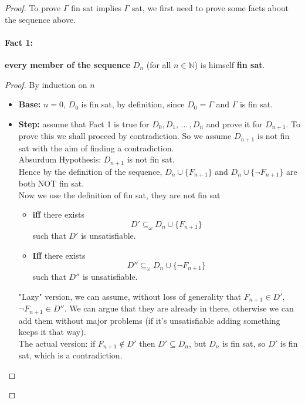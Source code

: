 \begin{proof}
		To prove $\Gamma$ fin sat implies $\Gamma$ sat, we first need to prove some facts about the sequence above.\\

		\newpage

		\paragraph{Fact 1:} \textbf{every member of the sequence} $D_n$ (for all $n \in \mathbb{N}$) is himself \textbf{fin sat}.

		\begin{proof}
			By induction on $n$
			\begin{itemize}
				\item \textbf{Base:} $n=0$, $D_0$ is fin sat, by definition, since $D_0 = \Gamma$ and $\Gamma$ is fin sat.

				\item \textbf{Step:} assume that Fact 1 is true for $D_0, D_1, \, ... \, , D_n$ and prove it for $D_{n+1}$. To prove this we shall proceed by contradiction. So we assume $D_{n+1}$ is not fin sat with the aim of finding a contradiction. \\

				Absurdum Hypothesis: $D_{n+1}$ is not fin sat. \\

				Hence by the definition of the sequence, $D_n \cup \{F_{n+1}\}$ and $D_n \cup \{\neg F_{n+1}\}$ are both NOT fin sat.\\

				Now we use the definition of fin sat, they are not fin sat
				\begin{itemize}[label=]
					\item \textbf{iff} there exists
					$$ D' \subseteq_\omega D_{n} \cup \{F_{n+1}\} $$
					such that $D'$ is unsatisfiable.\\

					\item \textbf{Iff} there exists
					$$ D'' \subseteq_\omega D_{n} \cup \{ \neg F_{n+1}\} $$
					such that $D''$ is unsatisfiable.\\
				\end{itemize}

				"Lazy" version, we can assume, without loss of generality that $F_{n+1} \in D'$, $\neg F_{n+1} \in D''$. We can argue that they are already in there, otherwise we can add them without major problems (if it's unsatisfiable adding something keeps it that way).\\
				The actual version: if $F_{n+1} \notin D'$ then $D' \subseteq D_n$, but $D_n$ is fin sat, so $D'$ is fin sat, which is a contradiction.\\


\end{itemize}
\end{proof}
\end{proof}
